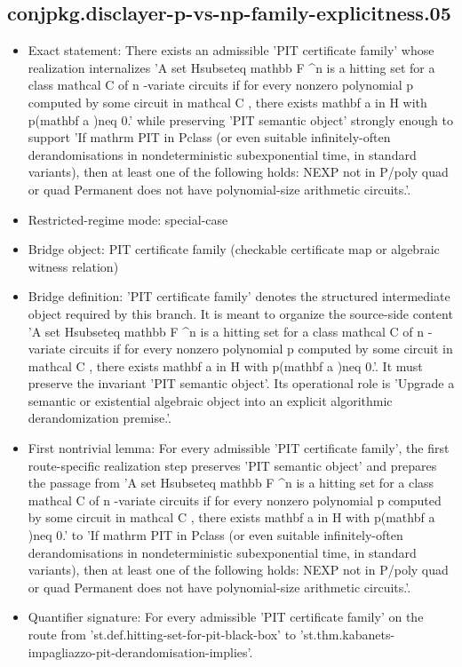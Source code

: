 \documentclass[11pt]{article}
\begin{document}
\subsection*{conjpkg.disclayer-p-vs-np-family-explicitness.05}
\begin{itemize}
\item Exact statement: There exists an admissible 'PIT certificate family' whose realization internalizes 'A set Hsubseteq mathbb F \textasciicircum{}n is a hitting set for a class mathcal C of n -variate circuits if for every nonzero polynomial p computed by some circuit in mathcal C , there exists mathbf a in H with p(mathbf a )neq 0.' while preserving 'PIT semantic object' strongly enough to support 'If mathrm PIT in Pclass (or even suitable infinitely-often derandomisations in nondeterministic subexponential time, in standard variants), then at least one of the following holds: NEXP not in P/poly quad or quad Permanent does not have polynomial-size arithmetic circuits.'.
\item Restricted-regime mode: special-case
\item Bridge object: PIT certificate family (checkable certificate map or algebraic witness relation)
\item Bridge definition: 'PIT certificate family' denotes the structured intermediate object required by this branch. It is meant to organize the source-side content 'A set Hsubseteq mathbb F \textasciicircum{}n is a hitting set for a class mathcal C of n -variate circuits if for every nonzero polynomial p computed by some circuit in mathcal C , there exists mathbf a in H with p(mathbf a )neq 0.'. It must preserve the invariant 'PIT semantic object'. Its operational role is 'Upgrade a semantic or existential algebraic object into an explicit algorithmic derandomization premise.'.
\item First nontrivial lemma: For every admissible 'PIT certificate family', the first route-specific realization step preserves 'PIT semantic object' and prepares the passage from 'A set Hsubseteq mathbb F \textasciicircum{}n is a hitting set for a class mathcal C of n -variate circuits if for every nonzero polynomial p computed by some circuit in mathcal C , there exists mathbf a in H with p(mathbf a )neq 0.' to 'If mathrm PIT in Pclass (or even suitable infinitely-often derandomisations in nondeterministic subexponential time, in standard variants), then at least one of the following holds: NEXP not in P/poly quad or quad Permanent does not have polynomial-size arithmetic circuits.'.
\item Quantifier signature: For every admissible 'PIT certificate family' on the route from 'st.def.hitting-set-for-pit-black-box' to 'st.thm.kabanets-impagliazzo-pit-derandomisation-implies'.

\end{itemize}
\end{document}
